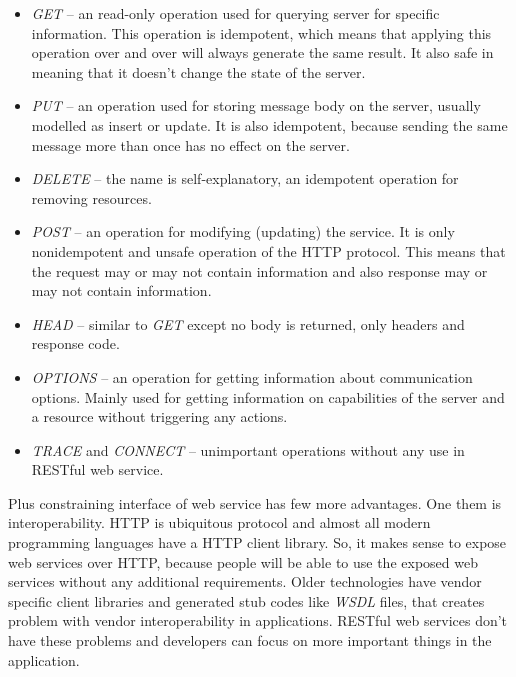 \documentclass[12pt,final,oneside]{fithesis2}
\begin{document}
\begin{itemize}
\item
\textit{GET} -- an read-only operation used for querying server for specific information. This operation is idempotent, which means that applying this operation over and over will always generate the same result. It also safe in meaning that it doesn't change the state of the server.

\item
\textit{PUT} -- an operation used for storing message body on the server, usually modelled as insert or update. It is also idempotent, because sending the same message more than once has no effect on the server.

\item
\textit{DELETE} -- the name is self-explanatory, an idempotent operation for removing resources.

\item
\textit{POST} -- an operation for modifying (updating) the service. It is only nonidempotent and unsafe operation of the HTTP protocol. This means that the request may or may not contain information and also response may or may not contain information.

\item
\textit{HEAD} -- similar to \textit{GET} except no body is returned, only headers and response code.

\item
\textit{OPTIONS} -- an operation for getting information about communication options. Mainly used for getting information on capabilities of the server and a resource without triggering any actions.

\item
\textit{TRACE} and \textit{CONNECT} -- unimportant operations without any use in RESTful web service.
\end{itemize}

Plus constraining interface of web service has few more advantages. One them is interoperability. HTTP is ubiquitous protocol and almost all modern programming languages have a HTTP client library. So, it makes sense to expose web services over HTTP, because people will be able to use the exposed web services without any additional requirements. Older technologies have vendor specific client libraries and generated stub codes like \textit{WSDL} files, that creates problem with vendor interoperability in applications. RESTful web services don't have these problems and developers can focus on more important things in the application.
\end{document}
